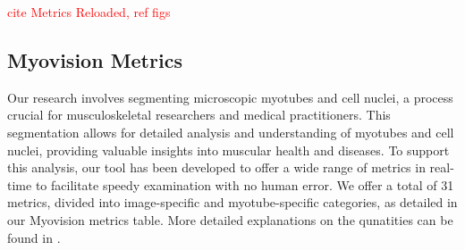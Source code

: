 \textcolor{red}{cite Metrics Reloaded, ref figs}

\subsection{Myovision Metrics}
Our research involves segmenting microscopic myotubes and cell nuclei, a process crucial for musculoskeletal researchers and medical practitioners. This segmentation allows for detailed analysis and understanding of myotubes and cell nuclei, providing valuable insights into muscular health and diseases. To support this analysis, our tool has been developed to offer a wide range of metrics in real-time to facilitate speedy examination with no human error. We offer a total of 31 metrics, divided into image-specific and myotube-specific categories, as detailed in our Myovision metrics table. More detailed explanations on the qunatities can be found in \cite{metricsreloaded}.
